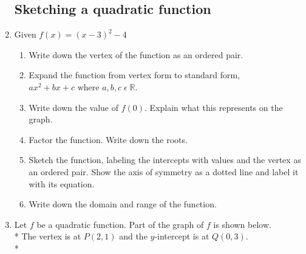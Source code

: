 \documentclass[12pt, twoside]{article}
\begin{document}
\begin{enumerate}
\subsection*{Sketching a quadratic function}
    \item   Given $f(x)=(x-3)^2-4$
    \begin{enumerate}[itemsep=0.9cm]
        \item Write down the vertex of the function as an ordered pair.
        \item Expand the function from vertex form to standard form, $ax^2+bx+c \text{ where } a, b, c \;  \epsilon \; \mathbb{R}$. \vspace{1cm}
        \item Write down the value of $f(0)$. Explain what this represents on the graph. \vspace{1cm}
        \item Factor the function. Write down the roots. \vspace{1cm}
        \item Sketch the function, labeling the intercepts with values and the vertex as an ordered pair. Show the axis of symmetry as a dotted line and label it with its equation.
        \begin{center}
            \end{center}
        \item Write down the domain and range of the function.
    \end{enumerate}

\newpage
  \item Let $f$ be a quadratic function. Part of the graph of $f$ is shown below.\\*
  The vertex is at $P(2,1)$ and the $y$-intercept is at $Q(0, 3)$.\\*

    \begin{figure}[!htbp]
    \begin{center}
\end{center}
\end{figure}
\end{enumerate}
\end{document}
